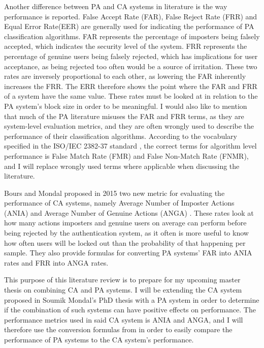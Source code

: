 \documentclass[informationsecurity]{gucmasterproject}
\begin{document}
Another difference between PA and CA systems in literature is the way performance is reported.
False Accept Rate (FAR), False Reject Rate (FRR) and Equal Error Rate(EER) are generally used for indicating the performance of PA classification algorithms.
FAR represents the percentage of imposters being falsely accepted, which indicates the security level of the system. 
FRR represents the percentage of genuine users being falsely rejected, which has implications for user acceptance, as being rejected too often would be a source of irritation.
These two rates are inversely proportional to each other, as lowering the FAR inherently increases the FRR.
The ERR therefore shows the point where the FAR and FRR of a system have the same value.
These rates must be looked at in relation to the PA system's block size in order to be meaningful.
I would also like to mention that much of the PA literature misuses the FAR and FRR terms, as they are system-level evaluation metrics, and they are often wrongly used to describe the performance of their classification algorithms.
According to the vocabulary specified in the ISO/IEC 2382-37 standard \cite{ISO-voc}, the correct terms for algorithm level performance is False Match Rate (FMR) and False Non-Match Rate (FNMR), and I will replace wrongly used terms where applicable when discussing the literature.

Bours and Mondal proposed in 2015 two new metric for evaluating the performance of CA systems, namely Average Number of Imposter Actions (ANIA) and Average Number of Genuine Actions (ANGA) \cite{CA-performance}.
These rates look at how many actions imposters and genuine users on average can perform before being rejected by the authentication system, as it often is more useful to know how often users will be locked out than the probability of that happening per sample.
They also provide formulas for converting PA systems' FAR into ANIA rates and FRR into ANGA rates.

This purpose of this literature review is to prepare for my upcoming master thesis on combining CA and PA systems.
I will be extending the CA system proposed in Soumik Mondal's PhD thesis \cite{mondal} with a PA system in order to determine if the combination of such systems can have positive effects on performance.
The performance metrics used in said CA system is ANIA and ANGA, and I will therefore use the conversion formulas from \cite{CA-performance} in order to easily compare the performance of PA systems to the CA system's performance.
\end{document}
